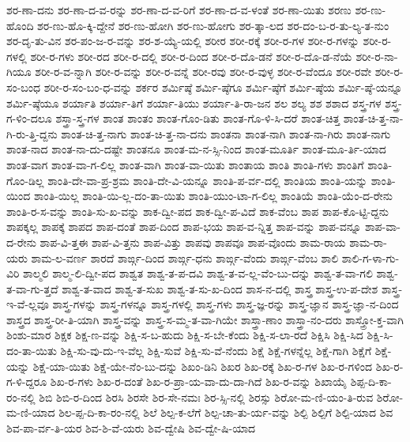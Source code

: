 {ಶರ-ಣಾ-ದನು
ಶರ-ಣಾ-ದ-ವ-ರನ್ನು
ಶರ-ಣಾ-ದ-ವ-ರಿಗೆ
ಶರ-ಣಾ-ದ-ವ-ಳಂತೆ
ಶರ-ಣಾ-ಯಿತು
ಶರಣು
ಶರ-ಣು-ಹೊಂದಿ
ಶರ-ಣು-ಹೊ-ಕ್ಕಿ-ದ್ದೇನೆ
ಶರ-ಣು-ಹೋಗಿ
ಶರ-ಣು-ಹೋಗು
ಶರ-ತ್ಕಾ-ಲದ
ಶರ-ದಂ-ಬ-ರ-ತು-ಲ್ಯ-ತ-ನುಂ
ಶರ-ದೃ-ತು-ವಿನ
ಶರ-ಪಂ-ಜ-ರ-ವನ್ನು
ಶರ-ಶ-ಯ್ಯೆ-ಯಲ್ಲಿ
ಶರೀರ
ಶರೀ-ರಕ್ಕೆ
ಶರೀ-ರ-ಗಳ
ಶರೀ-ರ-ಗಳನ್ನು
ಶರೀ-ರ-ಗಳಲ್ಲಿ
ಶರೀ-ರ-ಗಳು
ಶರೀ-ರದ
ಶರೀ-ರ-ದಲ್ಲಿ
ಶರೀ-ರ-ದಿಂದ
ಶರೀ-ರ-ದೊ-ಡನೆ
ಶರೀ-ರ-ದೊ-ಡ-ನೆಯೆ
ಶರೀ-ರ-ನಾ-ಗಿಯೂ
ಶರೀ-ರ-ವ-ನ್ನಾಗಿ
ಶರೀ-ರ-ವನ್ನು
ಶರೀ-ರ-ವನ್ನೆ
ಶರೀ-ರವು
ಶರೀ-ರ-ವುಳ್ಳ
ಶರೀ-ರ-ವೆಂದೂ
ಶರೀ-ರವೇ
ಶರೀ-ರ-ಸಂ-ಬಂಧ
ಶರೀ-ರ-ಸಂ-ಬಂ-ಧ-ವನ್ನು
ಶರ್ಕರ
ಶರ್ಮಿಷ್ಠೆ
ಶರ್ಮಿ-ಷ್ಠೆಗೂ
ಶರ್ಮಿ-ಷ್ಠೆಗೆ
ಶರ್ಮಿ-ಷ್ಠೆಯ
ಶರ್ಮಿ-ಷ್ಠೆ-ಯನ್ನೂ
ಶರ್ಮಿ-ಷ್ಠೆಯೂ
ಶರ್ಯಾತಿ
ಶರ್ಯಾ-ತಿಗೆ
ಶರ್ಯಾ-ತಿಯು
ಶರ್ಯಾ-ತಿ-ರಾ-ಜನ
ಶಲ
ಶಲ್ಯ
ಶಶ
ಶಶಾದ
ಶಸ್ತ್ರ-ಗಳ
ಶಸ್ತ್ರ-ಗ-ಳಿಂ-ದಲೂ
ಶಸ್ತ್ರಾ-ಸ್ತ್ರ-ಗಳ
ಶಾಂತ
ಶಾಂತಂ
ಶಾಂತ-ಗೊಂ-ಡಿತು
ಶಾಂತ-ಗೊ-ಳಿ-ಸಿ-ದರೆ
ಶಾಂತ-ಚಿತ್ತ
ಶಾಂತ-ಚಿ-ತ್ತ-ನಾ-ಗಿ-ರು-ತ್ತಿ-ದ್ದನು
ಶಾಂತ-ಚಿ-ತ್ತ-ನಾಗು
ಶಾಂತ-ಚಿ-ತ್ತ-ನಾ-ದನು
ಶಾಂತನಾ
ಶಾಂತ-ನಾಗಿ
ಶಾಂತ-ನಾ-ಗಿರು
ಶಾಂತ-ನಾಗು
ಶಾಂತ-ನಾದ
ಶಾಂತ-ನಾ-ದು-ದಷ್ಟೇ
ಶಾಂತನೂ
ಶಾಂತ-ಮ-ನ-ಸ್ಸಿ-ನಿಂದ
ಶಾಂತ-ಮೂರ್ತಿ
ಶಾಂತ-ಮೂ-ರ್ತಿ-ಯಾದ
ಶಾಂತ-ವಾಗ
ಶಾಂತ-ವಾ-ಗ-ಲಿಲ್ಲ
ಶಾಂತ-ವಾಗಿ
ಶಾಂತ-ವಾ-ಯಿತು
ಶಾಂತಾಯ
ಶಾಂತಿ
ಶಾಂತಿ-ಗಳು
ಶಾಂತಿಗೆ
ಶಾಂತಿ-ಗೊಂ-ಡಿಲ್ಲ
ಶಾಂತಿ-ದೇ-ವಾ-ಪ್ರ-ಶ್ರಮ
ಶಾಂತಿ-ದೇ-ವಿ-ಯನ್ನೂ
ಶಾಂತಿ-ಪ-ರ್ವ-ದಲ್ಲಿ
ಶಾಂತಿಯ
ಶಾಂತಿ-ಯನ್ನು
ಶಾಂತಿ-ಯಿಂದ
ಶಾಂತಿ-ಯಿಲ್ಲ
ಶಾಂತಿ-ಯಿ-ಲ್ಲ-ದಂ-ತಾ-ಯಿತು
ಶಾಂತಿ-ಯುಂ-ಟಾ-ಗ-ಲಿಲ್ಲ
ಶಾಂತಿಯೆ
ಶಾಂತಿ-ಯೆಂ-ದ-ರೇನು
ಶಾಂತಿ-ರ-ಸ-ವನ್ನು
ಶಾಂತಿ-ಸು-ಖ-ವನ್ನು
ಶಾಕ-ದ್ವೀ-ಪದ
ಶಾಕ-ದ್ವೀ-ಪ-ವಿದೆ
ಶಾಕ-ವೆಂಬ
ಶಾಪ
ಶಾಪ-ಕೊ-ಟ್ಟಿ-ದ್ದನು
ಶಾಪಕ್ಕಲ್ಲ
ಶಾಪಕ್ಕೆ
ಶಾಪದ
ಶಾಪ-ದಂತೆ
ಶಾಪ-ದಿಂದ
ಶಾಪ-ಭಯ
ಶಾಪ-ವ-ನ್ನಿತ್ತ
ಶಾಪ-ವನ್ನು
ಶಾಪ-ವನ್ನೂ
ಶಾಪ-ವಾ-ದ-ರೇನು
ಶಾಪ-ವಿ-ತ್ತಈ
ಶಾಪ-ವಿ-ತ್ತನು
ಶಾಪ-ವಿತ್ತು
ಶಾಪವು
ಶಾಪವೂ
ಶಾಪ-ವೊಂದು
ಶಾಮ-ರಾಯ
ಶಾಮ-ರಾ-ಯರು
ಶಾಮ-ಲ-ವರ್ಣ
ಶಾರದೆ
ಶಾರ್ಙ್ಗ-ದಿಂದ
ಶಾರ್ಙ್ಗ-ಧನು
ಶಾರ್ಙ್ಗ-ವೆಂದು
ಶಾರ್ಙ್ಗ-ವೆಂಬ
ಶಾಲಿ
ಶಾಲಿ-ಗ-ಳಾ-ಗು-ವಿರಿ
ಶಾಲ್ಮಲಿ
ಶಾಲ್ಮ-ಲಿ-ದ್ವೀ-ಪದ
ಶಾಶ್ವತ
ಶಾಶ್ವ-ತ-ಪ-ದವಿ
ಶಾಶ್ವ-ತ-ವ-ಲ್ಲ-ವೆಂ-ಬು-ದನ್ನು
ಶಾಶ್ವ-ತ-ವಾ-ಗಲಿ
ಶಾಶ್ವ-ತ-ವಾ-ಗು-ತ್ತದೆ
ಶಾಶ್ವ-ತ-ವಾದ
ಶಾಶ್ವ-ತ-ಸುಖ
ಶಾಶ್ವ-ತ-ಸು-ಖ-ದಿಂದ
ಶಾಸ-ನ-ದಲ್ಲಿ
ಶಾಸ್ತ್ರ
ಶಾಸ್ತ್ರ-ಉ-ಪ-ದೇಶ
ಶಾಸ್ತ್ರ-ಇ-ವೆ-ಲ್ಲವೂ
ಶಾಸ್ತ್ರ-ಗಳನ್ನು
ಶಾಸ್ತ್ರ-ಗಳನ್ನೂ
ಶಾಸ್ತ್ರ-ಗಳಲ್ಲಿ
ಶಾಸ್ತ್ರ-ಗಳು
ಶಾಸ್ತ್ರ-ಜ್ಞ-ರನ್ನು
ಶಾಸ್ತ್ರ-ಜ್ಞಾನ
ಶಾಸ್ತ್ರ-ಜ್ಞಾ-ನ-ದಿಂದ
ಶಾಸ್ತ್ರದ
ಶಾಸ್ತ್ರ-ರೀ-ತಿ-ಯಾಗಿ
ಶಾಸ್ತ್ರ-ವನ್ನು
ಶಾಸ್ತ್ರ-ಸ-ಮ್ಮ-ತ-ವಾ-ಗಿಯೇ
ಶಾಸ್ತ್ರಾ-ಣಾಂ
ಶಾಸ್ತ್ರಾ-ನಂ-ದರು
ಶಾಸ್ತ್ರೋ-ಕ್ತ-ವಾಗಿ
ಶಿಂಶು-ಮಾರ
ಶಿಕ್ಷಕ
ಶಿಕ್ಷ-ಣ-ವನ್ನು
ಶಿಕ್ಷಿ-ಸ-ಬ-ಹುದು
ಶಿಕ್ಷಿ-ಸ-ಬೇ-ಕೆಂದು
ಶಿಕ್ಷಿ-ಸ-ಲಾ-ರದೆ
ಶಿಕ್ಷಿಸಿ
ಶಿಕ್ಷಿ-ಸಿದ
ಶಿಕ್ಷಿ-ಸಿ-ದಂ-ತಾ-ಯಿತು
ಶಿಕ್ಷಿ-ಸು-ವು-ದು-ಇ-ವೆಲ್ಲ
ಶಿಕ್ಷಿ-ಸುವೆ
ಶಿಕ್ಷಿ-ಸು-ವೆ-ನೆಂದು
ಶಿಕ್ಷೆ
ಶಿಕ್ಷೆ-ಗಳನ್ನೆಲ್ಲ
ಶಿಕ್ಷೆ-ಗಾಗಿ
ಶಿಕ್ಷೆಗೆ
ಶಿಕ್ಷೆ-ಯನ್ನು
ಶಿಕ್ಷೆ-ಯಾ-ಯಿತು
ಶಿಕ್ಷೆ-ಯೇ-ನೆಂ-ಬು-ದನ್ನು
ಶಿಖಂ-ಡಿನಿ
ಶಿಖರ
ಶಿಖ-ರಕ್ಕೆ
ಶಿಖ-ರ-ಗಳ
ಶಿಖ-ರ-ಗಳಿಂದ
ಶಿಖ-ರ-ಗ-ಳಿ-ದ್ದರೂ
ಶಿಖ-ರ-ಗಳು
ಶಿಖ-ರ-ದಂತೆ
ಶಿಖ-ರ-ಪ್ರಾ-ಯ-ವಾ-ದು-ದಾ-ಗಿದೆ
ಶಿಖ-ರ-ವನ್ನು
ಶಿಖಾಯೈ
ಶಿಪ್ಪ-ದಿ-ಕಾ-ರಂ-ನಲ್ಲಿ
ಶಿಬಿ
ಶಿಬಿ-ರ-ದಿಂದ
ಶಿರಸಿ
ಶಿರಸೇ
ಶಿರ-ಸೇ-ನಮಃ
ಶಿರ-ಸ್ಸಿ-ನಲ್ಲಿ
ಶಿರಸ್ಸು
ಶಿರೋ-ಮ-ಣಿ-ಯಂ-ತಿ-ರುವ
ಶಿರೋ-ಮ-ಣಿ-ಯಾದ
ಶಿಲ-ಪ್ಪ-ದಿ-ಕಾ-ರಂ-ನಲ್ಲಿ
ಶಿಲೆ
ಶಿಲ್ಪ-ಕ-ಲೆಗೆ
ಶಿಲ್ಪ-ಚಾ-ತು-ರ್ಯ-ವನ್ನು
ಶಿಲ್ಪಿ
ಶಿಲ್ಪಿಗೆ
ಶಿಲ್ಪಿ-ಯಾದ
ಶಿವ
ಶಿವ-ಪಾ-ರ್ವ-ತಿ-ಯರ
ಶಿವ-ಶಿ-ವೆ-ಯರು
ಶಿವ-ದ್ವೇಷಿ
ಶಿವ-ದ್ವೇ-ಷಿ-ಯಾದ
}
